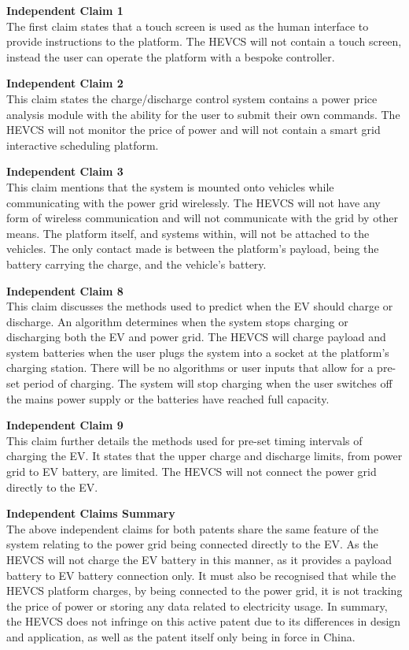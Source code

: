 \documentclass [12pt]{article}
\begin{document}
\textbf{Independent Claim 1}\\
The first claim states that a touch screen is used as the human interface to provide instructions to the platform. The HEVCS will not contain a touch screen, instead the user can operate the platform with a bespoke controller.

\textbf{Independent Claim 2}\\
This claim states the charge/discharge control system contains a power price analysis module with the ability for the user to submit their own commands.  The HEVCS will not monitor the price of power and will not contain a smart grid interactive scheduling platform.

\textbf{Independent Claim 3}\\
This claim mentions that the system is mounted onto vehicles while communicating with the power grid wirelessly. The HEVCS will not have any form of wireless communication and will not communicate with the grid by other means. The platform itself, and systems within, will not be attached to the vehicles. The only contact made is between the platform’s payload, being the battery carrying the charge, and the vehicle’s battery.

\textbf{Independent Claim 8}\\
This claim discusses the methods used to predict when the EV should charge or discharge. An algorithm determines when the system stops charging or discharging both the EV and power grid. The HEVCS will charge payload and system batteries when the user plugs the system into a socket at the platform’s charging station. There will be no algorithms or user inputs that allow for a pre-set period of charging. The system will stop charging when the user switches off the mains power supply or the batteries have reached full capacity.

\textbf{Independent Claim 9}\\
This claim further details the methods used for pre-set timing intervals of charging the EV. It states that the upper charge and discharge limits, from power grid to EV battery, are limited. The HEVCS will not connect the power grid directly to the EV.

\textbf{Independent Claims Summary}\\
The above independent claims for both patents share the same feature of the system relating to the power grid being connected directly to the EV. As the HEVCS will not charge the EV battery in this manner, as it provides a payload battery to EV battery connection only. It must also be recognised that while the HEVCS platform charges, by being connected to the power grid, it is not tracking the price of power or storing any data related to electricity usage. In summary, the HEVCS does not infringe on this active patent due to its differences in design and application, as well as the patent itself only being in force in China.
\end{document}
